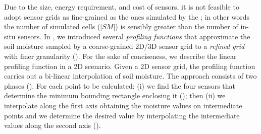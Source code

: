Due to the size, energy requirement, and cost of sensors, it is not feasible to adopt sensor grids as fine-grained as the ones simulated by the \olab{}; in other words the number of simulated cells ($|SM|$) is sensibly greater than the number of in-situ sensors.
In \cite{DBLP:journals/cea/FranciaGG22}, we introduced several \textit{profiling functions} that approximate the soil moisture sampled by a coarse-grained 2D/3D sensor grid to a \textit{refined grid} with finer granularity ().
For the sake of conciseness, we describe the linear profiling function in a 2D scenario.
Given a 2D sensor grid, the profiling function carries out a bi-linear interpolation of soil moisture.
The approach consists of two phases ().
For each point to be calculated: (i) we find the four sensors that determine the minimum bounding rectangle enclosing it (); then (ii) we interpolate along the first axis obtaining the moisture values on intermediate points and we determine the desired value by interpolating the intermediate values along the second axis ().

